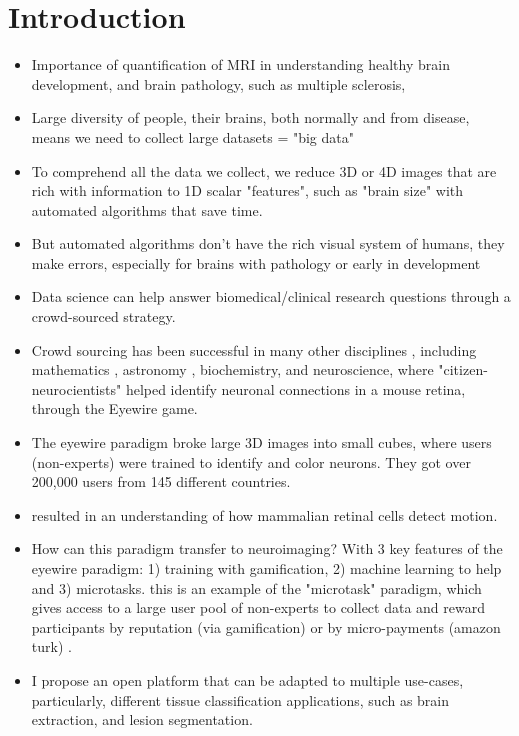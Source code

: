 \section{Introduction}
\begin{itemize}
\item Importance of quantification of MRI in understanding healthy brain development\cite{giedd1999brain}, and brain pathology, such as multiple sclerosis\cite{bakshi2008mri}, 
\item Large diversity of people, their brains, both normally and from disease, means we need to collect large datasets = "big data"
\item To comprehend all the data we collect, we reduce 3D or 4D images that are rich with information to 1D scalar "features", such as "brain size" with automated algorithms that save time.
\item But automated algorithms don't have the rich visual system of humans, they make errors, especially for brains with pathology or early in development
\item Data science can help answer biomedical/clinical research questions through a crowd-sourced strategy. 
\item Crowd sourcing has been successful in many other disciplines \cite{wiggins2011conservation}, including mathematics \cite{cranshaw2011polymath}, astronomy \cite{lintott2008galaxy}, biochemistry\cite{eiben2012increased}, and neuroscience\cite{kim2014space}, where "citizen-neurocientists" helped identify neuronal connections in a mouse retina, through the Eyewire game. 
\item The eyewire paradigm broke large 3D images into small cubes, where users (non-experts) were trained to identify and color neurons. They got over 200,000 users from 145 different countries.
\item resulted in an understanding of how mammalian retinal cells detect motion.
\item How can this paradigm transfer to neuroimaging? With 3 key features of the eyewire paradigm: 1) training with gamification, 2) machine learning to help and 3) microtasks. this is an example of the "microtask" paradigm, which gives access to a large user pool of non-experts to collect data and reward participants by reputation (via gamification) or  by micro-payments (amazon turk) \cite{kittur2008crowdsourcing}.
\item I propose an open platform that can be adapted to multiple use-cases, particularly, different tissue classification applications, such as brain extraction, and lesion segmentation. 
\end{itemize}

